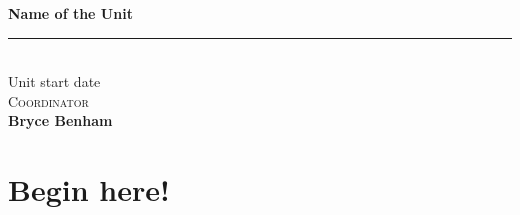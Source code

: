 \documentclass[a4paper,12pt]{article}
\date{}
\theoremstyle{definition}
\theoremstyle{plain}
\newcommand{\unitName}{Name of the Unit}
\newcommand{\unitDate}{Unit start date}
\newcommand{\unitCoordinator}{Coordinator}
\newcommand{\documentAuthor}{Bryce Benham}
\begin{document}
%
\begin{titlepage}
	\begin{center}
		{\Huge \textbf{\unitName}} \\[0.2in]
		\rule{0.7\textwidth}{0.6pt} \\[0.2in]
		{\large \unitDate} \\[0.3in]
		{\large \textsc{\unitCoordinator}} \\[0.2in]
		\vfill
		{\Large \textbf{\documentAuthor}} \\[0.1in]
	\end{center}
	\thispagestyle{empty}
\end{titlepage}
% 
\tableofcontents
\newpage
%
\section{Begin here!}
\end{document}

